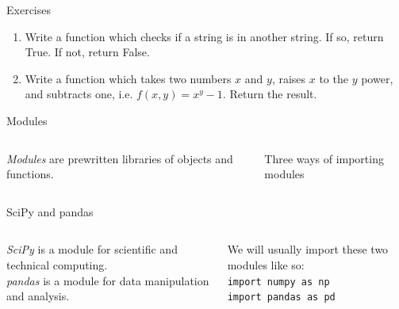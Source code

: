 \documentclass{beamer}
\begin{document}
\begin{frame}{Exercises}
    \begin{enumerate}
        \item Write a function which checks if a string is in another string. If so, return True. If not, return False.
        \item Write a function which takes two numbers $x$ and $y$, raises $x$ to the $y$ power, and subtracts one, i.e. $f(x, y) = x^y - 1$. Return the result.
    \end{enumerate}
\end{frame}

\begin{frame}{Modules}
    \begin{columns}
        \begin{column}{0.4\textwidth}
            \textit{Modules} are prewritten libraries of objects and functions.
        \end{column}
        \begin{column}{0.6\textwidth}
        Three ways of importing modules
        \small
\begin{block}{}
\begin{semiverbatim}

    \vspace*{0.5em}


    \vspace*{0.5em}

\end{semiverbatim}
\end{block}  
        \end{column}
    \end{columns}
\end{frame}

\begin{frame}{SciPy and pandas}
    \begin{columns}
        \begin{column}{0.5\textwidth}
            \textit{SciPy} is a module for scientific and technical computing. \\
            \vspace*{0.5em}
            \textit{pandas} is a module for data manipulation and analysis.
        \end{column}
        \begin{column}{0.5\textwidth}
        \small
        We will usually import these two modules like so: \\
        \vspace*{0.5em}
        \texttt{import numpy as np} \\
        \texttt{import pandas as pd}
        \end{column}
    \end{columns}
\end{frame}
\end{document}
